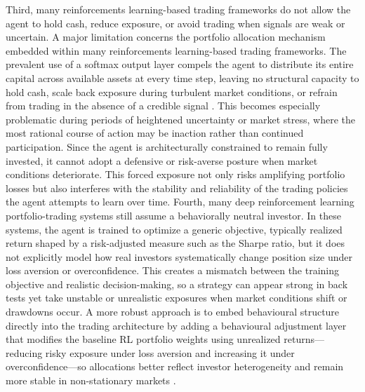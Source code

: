 \documentclass[a4paper,fleqn]{cas-sc}
\begin{document}
Third, many reinforcements learning-based trading frameworks do not allow the agent to hold cash, reduce exposure, or avoid trading when signals are weak or uncertain. A major limitation concerns the portfolio allocation mechanism embedded within many reinforcements learning-based trading frameworks. The prevalent use of a softmax output layer compels the agent to distribute its entire capital across available assets at every time step, leaving no structural capacity to hold cash, scale back exposure during turbulent market conditions, or refrain from trading in the absence of a credible signal \cite{long2025integrating}. This becomes especially problematic during periods of heightened uncertainty or market stress, where the most rational course of action may be inaction rather than continued participation. Since the agent is architecturally constrained to remain fully invested, it cannot adopt a defensive or risk-averse posture when market conditions deteriorate. This forced exposure not only risks amplifying portfolio losses but also interferes with the stability and reliability of the trading policies the agent attempts to learn over time. 
Fourth, many deep reinforcement learning portfolio-trading systems still assume a behaviorally neutral investor. In these systems, the agent is trained to optimize a generic objective, typically realized return shaped by a risk-adjusted measure such as the Sharpe ratio, but it does not explicitly model how real investors systematically change position size under loss aversion or overconfidence. This creates a mismatch between the training objective and realistic decision-making, so a strategy can appear strong in back tests yet take unstable or unrealistic exposures when market conditions shift or drawdowns occur. A more robust approach is to embed behavioural structure directly into the trading architecture by adding a behavioural adjustment layer that modifies the baseline RL portfolio weights using unrealized returns—reducing risky exposure under loss aversion and increasing it under overconfidence—so allocations better reflect investor heterogeneity and remain more stable in non-stationary markets \cite{charkhestani2026behaviorally}. 
\end{document}
